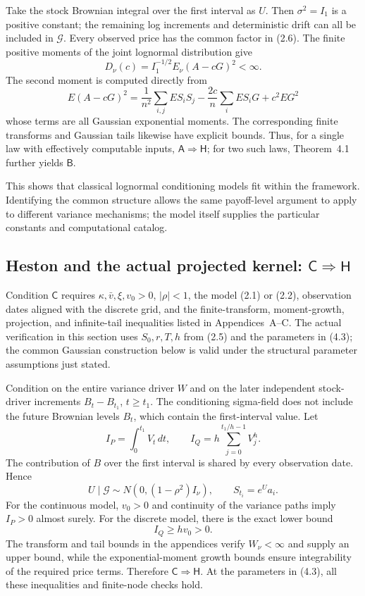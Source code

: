 Take the stock Brownian integral over the first interval as \(U\). Then \(\sigma^2=I_1\) is a positive constant; the remaining log increments and deterministic drift can all be included in \(\mathcal G\). Every observed price has the common factor in (2.6). The finite positive moments of the joint lognormal distribution give
\[
D_\nu(c)=I_1^{-1/2}E_\nu(A-cG)^2<\infty.
\]
The second moment is computed directly from
\[
E(A-cG)^2=\frac1{n^2}\sum_{i,j}ES_iS_j
-\frac{2c}{n}\sum_iES_iG+c^2EG^2
\tag{5.2}
\]
whose terms are all Gaussian exponential moments. The corresponding finite transforms and Gaussian tails likewise have explicit bounds. Thus, for a single law with effectively computable inputs, \(\mathsf A\Rightarrow\mathsf H\); for two such laws, Theorem~4.1 further yields \(\mathsf B\).

This shows that classical lognormal conditioning models fit within the framework. Identifying the common structure allows the same payoff-level argument to apply to different variance mechanisms; the model itself supplies the particular constants and computational catalog.

\subsection{Heston and the actual projected kernel: \(\mathsf C\Rightarrow\mathsf H\)}

Condition \(\mathsf C\) requires \(\kappa,\bar v,\xi,v_0>0\), \(|\rho|<1\), the model (2.1) or (2.2), observation dates aligned with the discrete grid, and the finite-transform, moment-growth, projection, and infinite-tail inequalities listed in Appendices~A--C. The actual verification in this section uses \(S_0,r,T,h\) from (2.5) and the parameters in (4.3); the common Gaussian construction below is valid under the structural parameter assumptions just stated.

Condition on the entire variance driver \(W\) and on the later independent stock-driver increments \(B_t-B_{t_1}\), \(t\ge t_1\). The conditioning sigma-field does not include the future Brownian levels \(B_t\), which contain the first-interval value. Let
\[
I_P=\int_0^{t_1}V_t\,dt,\qquad
I_Q=h\sum_{j=0}^{t_1/h-1}V_j^h.
\]
The contribution of \(B\) over the first interval is shared by every observation date. Hence
\[
U\mid\mathcal G\sim N(0,(1-\rho^2)I_\nu),\qquad S_{t_i}=e^Ua_i.
\tag{5.3}
\]
For the continuous model, \(v_0>0\) and continuity of the variance paths imply \(I_P>0\) almost surely. For the discrete model, there is the exact lower bound
\[
I_Q\ge hv_0>0.
\tag{5.4}
\]
The transform and tail bounds in the appendices verify \(W_\nu<\infty\) and supply an upper bound, while the exponential-moment growth bounds ensure integrability of the required price terms. Therefore \(\mathsf C\Rightarrow\mathsf H\). At the parameters in (4.3), all these inequalities and finite-node checks hold.

